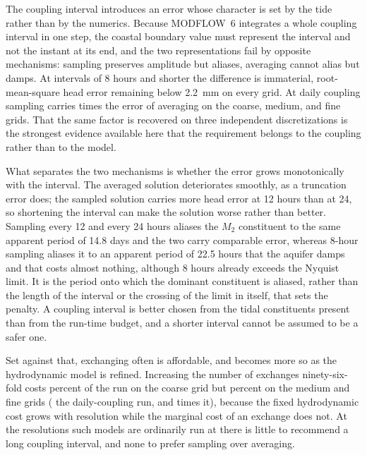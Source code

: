 \documentclass[preprint,authoryear,11pt]{elsarticle}
\begin{document}
The coupling interval introduces an error whose character is set by the tide rather than by the numerics. Because MODFLOW~6 integrates a whole coupling interval in one step, the coastal boundary value must represent the interval and not the instant at its end, and the two representations fail by opposite mechanisms: sampling preserves amplitude but aliases, averaging cannot alias but damps. At intervals of 8 hours and shorter the difference is immaterial, root-mean-square head error remaining below \SI{2.2}{\milli\meter} on every grid. At daily coupling sampling carries  times the error of averaging on the coarse, medium, and fine grids. That the same factor is recovered on three independent discretizations is the strongest evidence available here that the requirement belongs to the coupling rather than to the model.

What separates the two mechanisms is whether the error grows monotonically with the interval. The averaged solution deteriorates smoothly, as a truncation error does; the sampled solution carries more head error at 12 hours than at 24, so shortening the interval can make the solution worse rather than better. Sampling every 12 and every 24 hours aliases the $M_2$ constituent to the same apparent period of 14.8 days and the two carry comparable error, whereas 8-hour sampling aliases it to an apparent period of 22.5 hours that the aquifer damps and that costs almost nothing, although 8 hours already exceeds the Nyquist limit. It is the period onto which the dominant constituent is aliased, rather than the length of the interval or the crossing of the limit in itself, that sets the penalty. A coupling interval is better chosen from the tidal constituents present than from the run-time budget, and a shorter interval cannot be assumed to be a safer one.

Set against that, exchanging often is affordable, and becomes more so as the hydrodynamic model is refined. Increasing the number of exchanges ninety-six-fold costs  percent of the run on the coarse grid but  percent on the medium and fine grids ( the daily-coupling run, and  times it), because the fixed hydrodynamic cost grows with resolution while the marginal cost of an exchange does not. At the resolutions such models are ordinarily run at there is little to recommend a long coupling interval, and none to prefer sampling over averaging.
\end{document}
